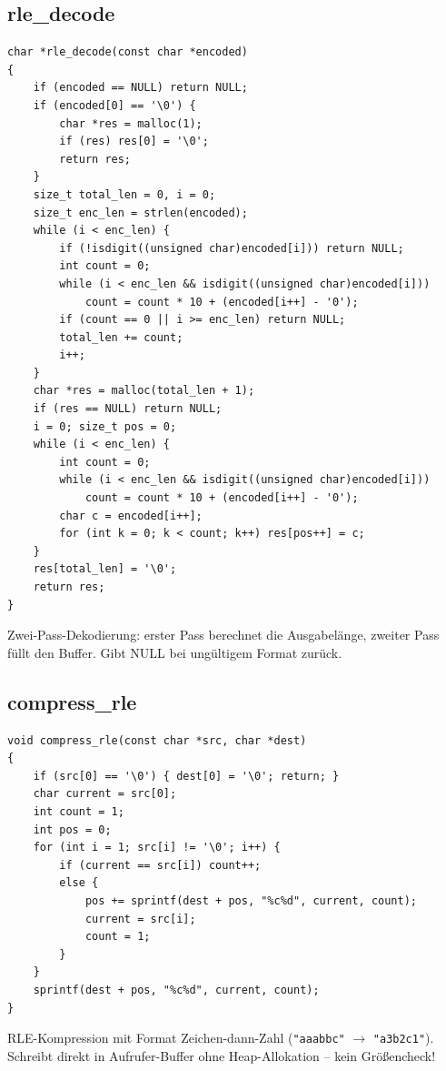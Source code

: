 \documentclass[10pt, a4paper]{article}
\begin{document}
\subsection{rle\_decode}
\begin{lstlisting}
char *rle_decode(const char *encoded)
{
    if (encoded == NULL) return NULL;
    if (encoded[0] == '\0') {
        char *res = malloc(1);
        if (res) res[0] = '\0';
        return res;
    }
    size_t total_len = 0, i = 0;
    size_t enc_len = strlen(encoded);
    while (i < enc_len) {
        if (!isdigit((unsigned char)encoded[i])) return NULL;
        int count = 0;
        while (i < enc_len && isdigit((unsigned char)encoded[i]))
            count = count * 10 + (encoded[i++] - '0');
        if (count == 0 || i >= enc_len) return NULL;
        total_len += count;
        i++;
    }
    char *res = malloc(total_len + 1);
    if (res == NULL) return NULL;
    i = 0; size_t pos = 0;
    while (i < enc_len) {
        int count = 0;
        while (i < enc_len && isdigit((unsigned char)encoded[i]))
            count = count * 10 + (encoded[i++] - '0');
        char c = encoded[i++];
        for (int k = 0; k < count; k++) res[pos++] = c;
    }
    res[total_len] = '\0';
    return res;
}
\end{lstlisting}
Zwei-Pass-Dekodierung: erster Pass berechnet die Ausgabel\"ange, zweiter Pass f\"ullt den Buffer. Gibt NULL bei ung\"ultigem Format zur\"uck.

\subsection{compress\_rle}
\begin{lstlisting}
void compress_rle(const char *src, char *dest)
{
    if (src[0] == '\0') { dest[0] = '\0'; return; }
    char current = src[0];
    int count = 1;
    int pos = 0;
    for (int i = 1; src[i] != '\0'; i++) {
        if (current == src[i]) count++;
        else {
            pos += sprintf(dest + pos, "%c%d", current, count);
            current = src[i];
            count = 1;
        }
    }
    sprintf(dest + pos, "%c%d", current, count);
}
\end{lstlisting}
RLE-Kompression mit Format Zeichen-dann-Zahl (\texttt{"aaabbc"} $\to$ \texttt{"a3b2c1"}). Schreibt direkt in Aufrufer-Buffer ohne Heap-Allokation -- kein Gr\"o\ss encheck!
\end{document}
